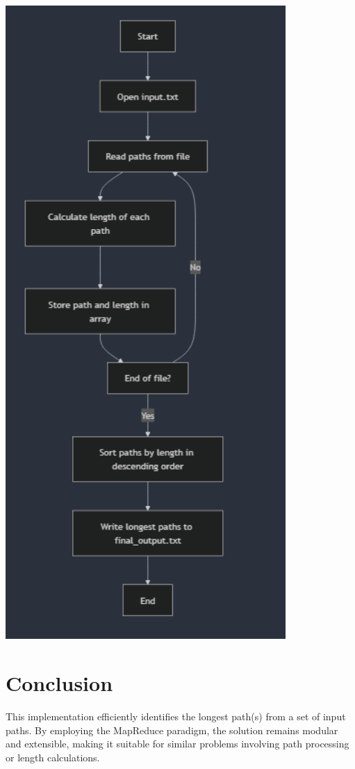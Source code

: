 \documentclass[12pt]{article}
\begin{document}
\begin{center}
    \includegraphics[width=0.8\textwidth]{lab5-flowchart.png} %
\end{center}

\section*{Conclusion}
This implementation efficiently identifies the longest path(s) from a set of input paths. By employing the MapReduce paradigm, the solution remains modular and extensible, making it suitable for similar problems involving path processing or length calculations.
\end{document}
